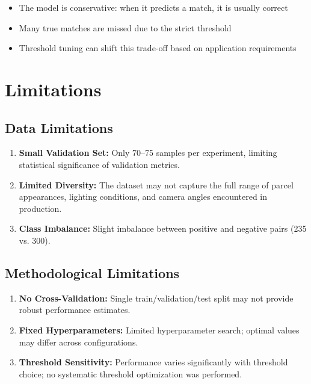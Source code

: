 \documentclass[12pt,a4paper]{article}
\begin{document}
\begin{itemize}
    \item The model is conservative: when it predicts a match, it is usually correct
    \item Many true matches are missed due to the strict threshold
    \item Threshold tuning can shift this trade-off based on application requirements
\end{itemize}

\section{Limitations}
\label{sec:limitations}

\subsection{Data Limitations}

\begin{enumerate}
    \item \textbf{Small Validation Set:} Only 70--75 samples per experiment, limiting statistical significance of validation metrics.
    
    \item \textbf{Limited Diversity:} The dataset may not capture the full range of parcel appearances, lighting conditions, and camera angles encountered in production.
    
    \item \textbf{Class Imbalance:} Slight imbalance between positive and negative pairs (235 vs. 300).
\end{enumerate}

\subsection{Methodological Limitations}

\begin{enumerate}
    \item \textbf{No Cross-Validation:} Single train/validation/test split may not provide robust performance estimates.
    
    \item \textbf{Fixed Hyperparameters:} Limited hyperparameter search; optimal values may differ across configurations.
    
    \item \textbf{Threshold Sensitivity:} Performance varies significantly with threshold choice; no systematic threshold optimization was performed.
\end{enumerate}
\end{document}
